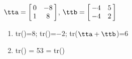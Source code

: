 {$\tta = \left[\hskip -3pt \begin{array}{cc} 0&-8\\  1&8\end {array} \hskip -3pt
 \right]$,
 \quad
$\ttb = \left[\hskip -3pt \begin{array}{cc} -4&5\\  -4&2\end {array} \hskip -3pt
 \right] $
} 
{\begin{enumerate}
\item	tr(\tta)=$8$; tr(\ttb)=$-2$; tr($\tta+\ttb$)=$6$
\item	tr(\tta\ttb) = 53 = tr(\ttb\tta)
\end{enumerate}
}



  


